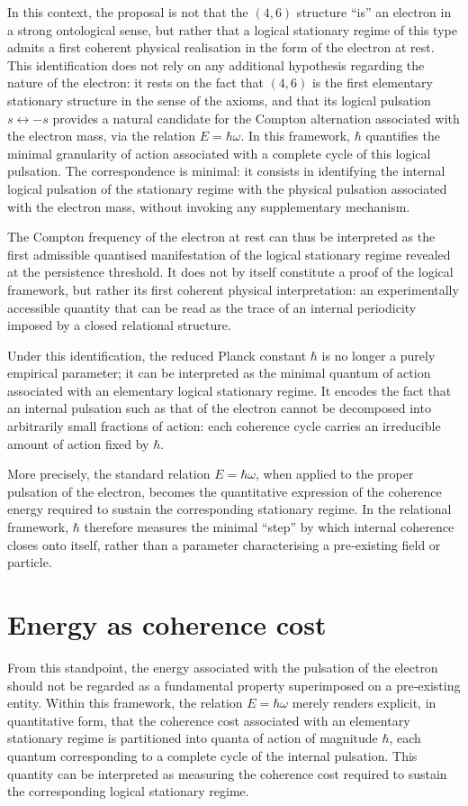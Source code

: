 \documentclass[11pt,a4paper]{article}
\begin{document}
In this context, the proposal is not that the \((4,6)\) structure “is” an electron in a strong ontological sense, but rather that a logical stationary regime of this type admits a first coherent physical realisation in the form of the electron at rest. This identification does not rely on any additional hypothesis regarding the nature of the electron: it rests on the fact that \((4,6)\) is the first elementary stationary structure in the sense of the axioms, and that its logical pulsation \(s \leftrightarrow -s\) provides a natural candidate for the Compton alternation associated with the electron mass, via the relation \(E = \hbar \omega\). In this framework, \(\hbar\) quantifies the minimal granularity of action associated with a complete cycle of this logical pulsation. The correspondence is minimal: it consists in identifying the internal logical pulsation of the stationary regime with the physical pulsation associated with the electron mass, without invoking any supplementary mechanism.

The Compton frequency of the electron at rest can thus be interpreted as the first admissible quantised manifestation of the logical stationary regime revealed at the persistence threshold. It does not by itself constitute a proof of the logical framework, but rather its first coherent physical interpretation: an experimentally accessible quantity that can be read as the trace of an internal periodicity imposed by a closed relational structure.

Under this identification, the reduced Planck constant \(\hbar\) is no longer a purely empirical parameter; it can be interpreted as the minimal quantum of action associated with an elementary logical stationary regime. It encodes the fact that an internal pulsation such as that of the electron cannot be decomposed into arbitrarily small fractions of action: each coherence cycle carries an irreducible amount of action fixed by \(\hbar\).

More precisely, the standard relation \(E = \hbar \omega\), when applied to the proper pulsation of the electron, becomes the quantitative expression of the coherence energy required to sustain the corresponding stationary regime. In the relational framework, \(\hbar\) therefore measures the minimal “step” by which internal coherence closes onto itself, rather than a parameter characterising a pre‑existing field or particle.

\section{Energy as coherence cost}
From this standpoint, the energy associated with the pulsation of the electron should not be regarded as a fundamental property superimposed on a pre‑existing entity. Within this framework, the relation \(E = \hbar \omega\) merely renders explicit, in quantitative form, that the coherence cost associated with an elementary stationary regime is partitioned into quanta of action of magnitude \(\hbar\), each quantum corresponding to a complete cycle of the internal pulsation. This quantity can be interpreted as measuring the coherence cost required to sustain the corresponding logical stationary regime. 
\end{document}
